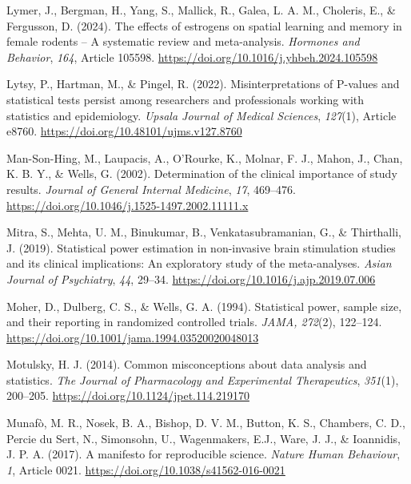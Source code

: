 \documentclass[authordate, meta]{jote-new-article}
\begin{document}
	Lymer, J., Bergman, H., Yang, S., Mallick, R., Galea, L. A. M., Choleris, E., \& Fergusson, D. (2024). The effects of estrogens on spatial learning and memory in female rodents -- A systematic review and meta-analysis. \emph{Hormones and Behavior}, \emph{164}, Article 105598. \url{https://doi.org/10.1016/j.yhbeh.2024.105598}



	Lytsy, P., Hartman, M., \& Pingel, R. (2022). Misinterpretations of P-values and statistical tests persist among researchers and professionals working with statistics and epidemiology. \emph{Upsala Journal of Medical Sciences}, \emph{127}(1), Article e8760. \url{https://doi.org/10.48101/ujms.v127.8760}



	Man-Son-Hing, M., Laupacis, A., O'Rourke, K., Molnar, F. J., Mahon, J., Chan, K. B. Y., \& Wells, G. (2002). Determination of the clinical importance of study results. \emph{Journal of General Internal Medicine}, \emph{17}, 469--476. \url{https://doi.org/10.1046/j.1525-1497.2002.11111.x}



	Mitra, S., Mehta, U. M., Binukumar, B., Venkatasubramanian, G., \& Thirthalli, J. (2019). Statistical power estimation in non-invasive brain stimulation studies and its clinical implications: An exploratory study of the meta-analyses. \emph{Asian Journal of Psychiatry}, \emph{44}, 29--34. \url{https://doi.org/10.1016/j.ajp.2019.07.006}



	Moher, D., Dulberg, C. S., \& Wells, G. A. (1994). Statistical power, sample size, and their reporting in randomized controlled trials. \emph{JAMA, 272}(2), 122--124. \url{https://doi.org/10.1001/jama.1994.03520020048013}



	Motulsky, H. J. (2014). Common misconceptions about data analysis and statistics. \emph{The Journal of Pharmacology and Experimental Therapeutics}, \emph{351}(1), 200--205. \url{https://doi.org/10.1124/jpet.114.219170}



	Munafò, M. R., Nosek, B. A., Bishop, D. V. M., Button, K. S., Chambers, C. D., Percie du Sert, N., Simonsohn, U., Wagenmakers, E.J., Ware, J. J., \& Ioannidis, J. P. A. (2017). A manifesto for reproducible science. \emph{Nature Human Behaviour}, \emph{1}, Article 0021. \url{https://doi.org/10.1038/s41562-016-0021}
\end{document}
